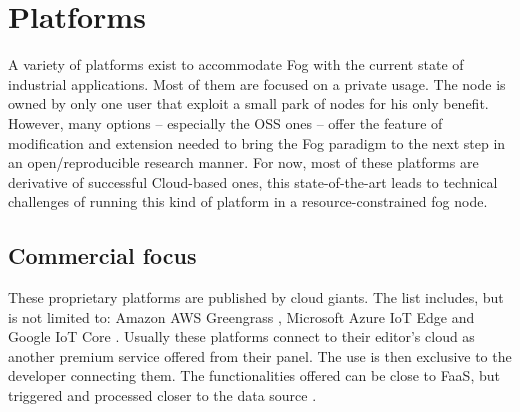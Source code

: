 \documentclass[11pt]{sdm}
\begin{document}
\section{Platforms}
\label{sec:platforms}

A variety of platforms exist to accommodate Fog with the current state of industrial applications. Most of them are focused on a private usage. The node is owned by only one user that exploit a small park of nodes for his only benefit. However, many options -- especially the \gls{OSS} ones -- offer the feature of modification and extension needed to bring the Fog paradigm to the next step in an open/reproducible research manner. For now, most of these platforms are derivative of successful Cloud-based ones, this state-of-the-art leads to technical challenges of running this kind of platform in a resource-constrained fog node.



\subsection{Commercial focus}

These proprietary platforms are published by cloud giants. The list includes, but is not limited to: Amazon AWS Greengrass \cite{noauthor_aws_nodate}, Microsoft Azure IoT Edge \cite{noauthor_iot_nodate} and Google IoT Core \cite{noauthor_cloud_nodate}. Usually these platforms connect to their editor's cloud as another premium service offered from their panel. The use is then exclusive to the developer connecting them. The functionalities offered can be close to \gls{FaaS}, but triggered and processed closer to the data source \cite{elgamal_costless_2018}.
\end{document}
